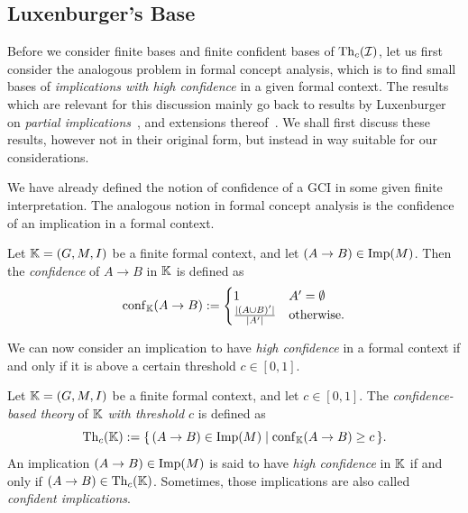 \subsection{Luxenburger's Base}
\label{Luxen-base}

Before we consider finite bases and finite confident bases of $\operatorname{Th}_c(\mathcal{I})$, let us
first consider the analogous problem in formal concept analysis, which is to find small
bases of \emph{implications with high confidence} in a given formal context.  The results
which are relevant for this discussion mainly go back to results by Luxenburger on
\emph{partial implications}~\cite{diss:Luxenburger,Luxenburger91}, and extensions
thereof~\cite{DBLP:conf/ki/StummeTBPL01}.  We shall first discuss these results, however
not in their original form, but instead in way suitable for our considerations.

We have already defined the notion of confidence of a GCI in some given finite
interpretation.  The analogous notion in formal concept analysis is the confidence of an
implication in a formal context.

\begin{Definition}
  \label{def:confidence-of-implications}
  Let ${\mathbb{K}} = (G, M, I)$ be a finite formal context, and let $(A \to B) \in \operatorname{Imp}(M)$.
  Then the \emph{confidence} of $A \to B$ in ${\mathbb{K}}$ is defined as
  \begin{equation*}
    \operatorname{conf}_{{\mathbb{K}}}(A \to B) :=
    \begin{cases}
      1 & A' = \emptyset \\
      \frac{ \lvert (A \cup B)' \rvert } { \lvert A' \rvert } & \text{otherwise}.
    \end{cases}
  \end{equation*}
\end{Definition}

We can now consider an implication to have \emph{high confidence} in a formal context if
and only if it is above a certain threshold $c \in [0,1]$.

\begin{Definition}
  \label{def:theory-with-threshold-for-formal-contexts}
  Let ${\mathbb{K}} = (G, M, I)$ be a finite formal context, and let $c \in [0,1]$.  The
  \emph{confidence-based theory} of ${\mathbb{K}}$ \emph{with threshold $c$} is defined as
  \begin{equation*}
    \operatorname{Th}_c({\mathbb{K}}) := {\{\, (A \to B) \in \operatorname{Imp}(M) \mid \operatorname{conf}_{{\mathbb{K}}}(A \to B) \ge c \,\}}.
  \end{equation*}
  An implication $(A \to B) \in \operatorname{Imp}(M)$ is said to have \emph{high confidence} in ${\mathbb{K}}$ if and only if $(A \to B) \in \operatorname{Th}_c({\mathbb{K}})$.  Sometimes, those implications are also
  called \emph{confident implications}.
\end{Definition}

